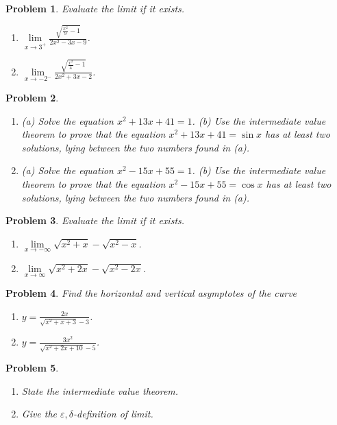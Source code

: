 \documentclass{article}
\newtheorem{problem}{Problem}
\begin{document}
\begin{problem}
Evaluate the limit if it exists.
\begin{enumerate}
\item $\lim\limits_{x\to 3^+} \frac{\sqrt{\frac{x^2}{9}-1 }}{2x^2 -3x-9 }$. 
\item $\lim\limits_{x\to -2^-} \frac{\sqrt{\frac{x^2}{4}-1 }}{2x^2 +3x-2 }$. 
\end{enumerate}
\end{problem}
\begin{problem}~
\begin{enumerate}
\item (a) Solve the equation $x^2+13x+41=1$.  (b) Use the intermediate value theorem to prove that the equation $x^2+13x+41=\sin  x$ has at least two solutions, lying between the two numbers found in (a).
\item (a) Solve the equation $x^2-15x+55=1$.  (b) Use the intermediate value theorem to prove that the equation $x^2-15x+55=\cos  x$ has at least two solutions, lying between the two numbers found in (a).
\end{enumerate}
\end{problem}
\begin{problem}
Evaluate the limit if it exists.
\begin{enumerate}
\item $\lim\limits_{x\to-\infty}\sqrt{x^2+x}-\sqrt{x^2-x}$. 
\item $\lim\limits_{x\to\infty}\sqrt{x^2+2x}-\sqrt{x^2-2x} $. 
\end{enumerate}
\end{problem}
\begin{problem}
Find the horizontal and vertical asymptotes of the curve
\begin{enumerate}
\item $y=\frac{2x}{\sqrt{x^2+x+3}-3}$. 
\item $y=\frac{3x^2}{\sqrt{x^2+2x+10}-5}$. 
\end{enumerate}
\end{problem}
\begin{problem}~
\begin{enumerate}
\item State the intermediate value theorem.
\item Give the $\varepsilon,\delta$-definition of limit.
\end{enumerate}
\end{problem}
\end{document}
